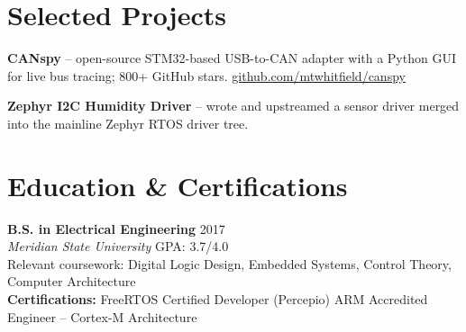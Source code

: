 \documentclass[10pt,letterpaper]{article}
\begin{document}
\section*{Selected Projects}
\begin{tightitem}
  \item \textbf{\color{inkNavy}CANspy} -- open-source STM32-based USB-to-CAN adapter with a Python GUI for live bus tracing; 800+ GitHub stars. \href{https://github.com/mtwhitfield/canspy}{github.com/mtwhitfield/canspy}
  \item \textbf{\color{inkNavy}Zephyr I2C Humidity Driver} -- wrote and upstreamed a sensor driver merged into the mainline Zephyr RTOS driver tree.
\end{tightitem}

\section*{Education \& Certifications}
\textbf{\color{inkNavy}B.S. in Electrical Engineering} \hfill {\small\color{slateGray}2017}\\
\textit{\color{circuitTeal}Meridian State University} \hfill {\small\color{slateGray}GPA: 3.7/4.0}\\[1pt]
{\small\color{slateGray}Relevant coursework: Digital Logic Design, Embedded Systems, Control Theory, Computer Architecture}\\[3pt]
{\small\color{circuitTeal}\textbf{Certifications:}} {\small\color{slateGray}FreeRTOS Certified Developer (Percepio) \quad\textbullet\quad ARM Accredited Engineer -- Cortex-M Architecture}
\end{document}

